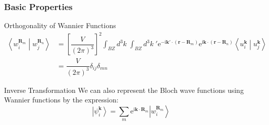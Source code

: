 \documentclass{beamer}
\begin{document}
  \begin{frame}
    \frametitle{Basic Properties}

    \begin{block}{Orthogonality of Wannier Functions}
      \small
      \begin{equation}
        \begin{aligned}
          \left\langle{}w_i^{\mathbf{R}_m}\middle|{}w_j^{\mathbf{R}_n}\right\rangle &= \left[\dfrac{V}{(2\pi)^3}\right]^2\int_{BZ}d^3k\;\int_{BZ}d^3k\;'\mathrm{e}^{-\mathrm{i}\mathbf{k}'\cdot{}(\mathbf{r}-\mathbf{R}_m)}\mathrm{e}^{\mathrm{i}\mathbf{k}\cdot{}(\mathbf{r}-\mathbf{R}_n)}\left\langle{}u_i^{\mathbf{k}}\middle|{}u_j^{\mathbf{k}}\right\rangle\\
          &= \dfrac{V}{(2\pi)^3}\delta_{ij}\delta_{mn}
        \end{aligned}
      \end{equation}    
    \end{block}

    \begin{block}{Inverse Transformation}
      We can also represent the Bloch wave functions using Wannier functions by the expression:
      \begin{equation}
        \left|\psi_i^{\mathbf{k}}\right\rangle = \sum_m \mathrm{e}^{\mathrm{i}\mathbf{k}\cdot\mathbf{R}_m}\left|w_i^{\mathbf{R}_m}\right\rangle
      \end{equation}    
    \end{block}

    \end{frame}
\end{document}
